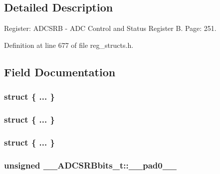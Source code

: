 \subsection{Detailed Description}
Register\+: A\+D\+C\+S\+R\+B -\/ A\+D\+C Control and Status Register B. Page\+: 251. 

Definition at line 677 of file reg\+\_\+structs.\+h.



\subsection{Field Documentation}
\hypertarget{union_____a_d_c_s_r_bbits__t_a80b3af9a8f7e60987f8ce092b0e4a34e}{\subsubsection[{"@163}]{\setlength{\rightskip}{0pt plus 5cm}struct \{ ... \} }}\label{union_____a_d_c_s_r_bbits__t_a80b3af9a8f7e60987f8ce092b0e4a34e}
\hypertarget{union_____a_d_c_s_r_bbits__t_a2a085374834220cd2bcdd34efefd7055}{\subsubsection[{"@165}]{\setlength{\rightskip}{0pt plus 5cm}struct \{ ... \} }}\label{union_____a_d_c_s_r_bbits__t_a2a085374834220cd2bcdd34efefd7055}
\hypertarget{union_____a_d_c_s_r_bbits__t_aaa23e75f2a9f709e961a17ef39b50a03}{\subsubsection[{"@167}]{\setlength{\rightskip}{0pt plus 5cm}struct \{ ... \} }}\label{union_____a_d_c_s_r_bbits__t_aaa23e75f2a9f709e961a17ef39b50a03}
\hypertarget{union_____a_d_c_s_r_bbits__t_a8405cf8419325c29fa3ed69b02b95ade}{
\subsubsection[{\+\_\+\+\_\+pad0\+\_\+\+\_\+}]{\setlength{\rightskip}{0pt plus 5cm}unsigned \+\_\+\+\_\+\+A\+D\+C\+S\+R\+Bbits\+\_\+t\+::\+\_\+\+\_\+pad0\+\_\+\+\_\+}}\label{union_____a_d_c_s_r_bbits__t_a8405cf8419325c29fa3ed69b02b95ade}


